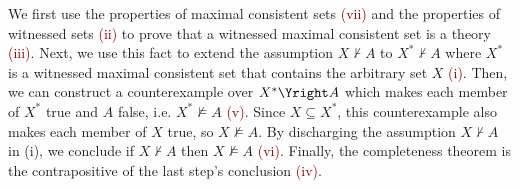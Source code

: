 We first use the properties of maximal consistent sets \textcolor{Maroon}{(vii)} and the properties of witnessed sets \textcolor{Maroon}{(ii)} to prove that a witnessed maximal consistent set is a theory \textcolor{Maroon}{(iii)}. Next, we use this fact to extend the assumption $X \not\vdash A$ to $X^* \not\vdash A$ where $X^*$ is a witnessed maximal consistent set that contains the arbitrary set $X$ \textcolor{Maroon}{(i)}. Then, we can construct a counterexample over $X^* \Yright A$ which makes each member of $X^*$ true and $A$ false, i.e. $X^* \not\vDash A$ \textcolor{Maroon}{(v)}. Since $X \subseteq X^*$, this counterexample also makes each member of $X$ true, so $X \not\vDash A$. By discharging the assumption $X \not\vdash A$ in (i), we conclude if $X \not\vdash A$ then $X \not\vDash A$ \textcolor{Maroon}{(vi)}. Finally, the completeness theorem is the contrapositive of the last step's conclusion \textcolor{Maroon}{(iv)}.
